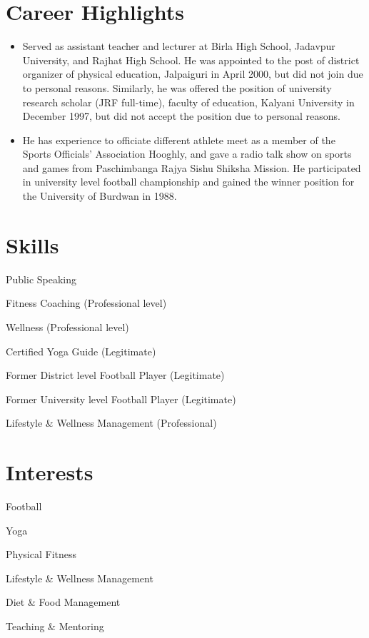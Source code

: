 \documentclass[letterpaper,11pt]{article}
\newcommand{\resumeItem}[1]{\item\small{{#1 \vspace{0pt}}}}
\newcommand{\resumeSubHeadingListStart}{\begin{itemize}[leftmargin=0.0in, label={}]}
\newcommand{\resumeSubHeadingListEnd}{\end{itemize}\vspace{0pt}}
\begin{document}
\section{Career Highlights}
  \resumeSubHeadingListStart
    \resumeItem{Served as assistant teacher and lecturer at Birla High School, Jadavpur University, and Rajhat High School. He was appointed to the post of district organizer of physical education, Jalpaiguri in April 2000, but did not join due to personal reasons. Similarly, he was offered the position of university research scholar (JRF full-time), faculty of education, Kalyani University in December 1997, but did not accept the position due to personal reasons.}
    \resumeItem{He has experience to officiate different athlete meet as a member of the Sports Officials' Association Hooghly, and gave a radio talk show on sports and games from Paschimbanga Rajya Sishu Shiksha Mission. He participated in university level football championship and gained the winner position for the University of Burdwan in 1988.}
  \resumeSubHeadingListEnd

\section{Skills}
  \begin{multicols}{2}
  \begin{itemize}[leftmargin=0.2in, label={$\bullet$}]
    \small{\item{Public Speaking}}
    \small{\item{Fitness Coaching (Professional level)}}
    \small{\item{Wellness (Professional level)}}
    \small{\item{Certified Yoga Guide (Legitimate)}}
    \small{\item{Former District level Football Player (Legitimate)}}
    \small{\item{Former University level Football Player (Legitimate)}}
    \small{\item{Lifestyle \& Wellness Management (Professional)}}
  \end{itemize}
  \end{multicols}
  \vspace{10pt}

\section{Interests}
  \begin{multicols}{2}
  \begin{itemize}[leftmargin=0.2in, label={$\bullet$}]
    \small{\item{Football}}
    \small{\item{Yoga}}
    \small{\item{Physical Fitness}}
    \small{\item{Lifestyle \& Wellness Management}}
    \small{\item{Diet \& Food Management}}
    \small{\item{Teaching \& Mentoring}}
  \end{itemize}
  \end{multicols}
  \vspace{10pt}
\end{document}
